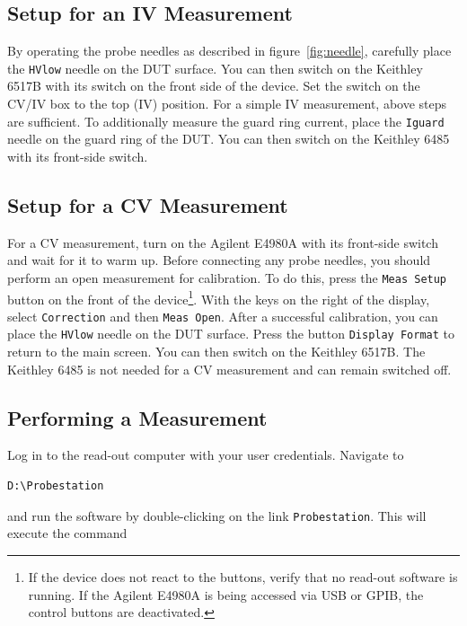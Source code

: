 \documentclass[a4paper]{article}
\begin{document}
\subsection{Setup for an IV Measurement}
\label{sec:ivsetup}

By operating the probe needles as described in figure~\ref{fig:needle}, carefully place the {\tt HVlow} needle on the DUT surface.
You can then switch on the Keithley 6517B with its switch on the front side of the device.
Set the switch on the CV/IV box to the top (IV) position.
For a simple IV measurement, above steps are sufficient.
To additionally measure the guard ring current, place the {\tt Iguard} needle on the guard ring of the DUT.
You can then switch on the Keithley 6485 with its front-side switch.\\

\subsection{Setup for a CV Measurement}
\label{sec:cvsetup}

For a CV measurement, turn on the Agilent E4980A with its front-side switch and wait for it to warm up.
Before connecting any probe needles, you should perform an open measurement for calibration.
To do this, press the {\tt Meas Setup} button on the front of the device\footnote{If the device does not react to the buttons, verify that no read-out software is running. If the Agilent E4980A is being accessed via USB or GPIB, the control buttons are deactivated.}.
With the keys on the right of the display, select {\tt Correction} and then {\tt Meas Open}.
After a successful calibration, you can place the {\tt HVlow} needle on the DUT surface.
Press the button {\tt Display Format} to return to the main screen.
You can then switch on the Keithley 6517B.
The Keithley 6485 is not needed for a CV measurement and can remain switched off.\\

\subsection{Performing a Measurement}
\label{sec:ivmeas}

Log in to the read-out computer with your user credentials.
Navigate to

\begin{lstlisting}
D:\Probestation
\end{lstlisting}

and run the software by double-clicking on the link {\tt Probestation}.
This will execute the command
\end{document}
